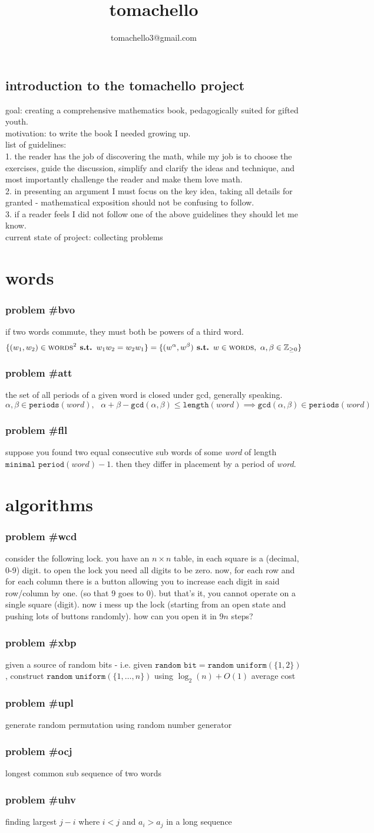 \documentclass{article}
\title{tomachello}
\author{tomachello3@gmail.com}
\date{}
\newcommand{\st}{\textbf{ s.t. }}
\newcommand{\SP}{\text{ }}
\newcommand{\problem}[1]{\subsubsection*{\textbf{problem \##1}}}
\newcommand{\chapter}[1]{\section*{#1}}
\newcommand{\Zpf}{\mathbb{Z}_{\ge0}}
\newcommand{\CST}[1]{\textsc{#1}}
\newcommand{\FNC}[1]{\texttt{#1}}
\newcommand{\VAR}[1]{\textit{#1}}
\begin{document}
\maketitle

\subsection*{introduction to the tomachello project}
goal: creating a comprehensive mathematics book, pedagogically suited for gifted youth.\\
motivation: to write the book I needed growing up.\\
list of guidelines:\\
1. the reader has the job of discovering the math, while my job is to choose the exercises, guide the discussion, simplify and clarify the ideas and technique, and most importantly challenge the reader and make them love math.\\
2. in presenting an argument I must focus on the key idea, taking all details for granted - mathematical exposition should not be confusing to follow.\\
3. if a reader feels I did not follow one of the above guidelines they should let me know.\\
current state of project: collecting problems

\chapter{words}
\problem{bvo} if two words commute, they must both be powers of a third word. 
$$\{(w_1,w_2)\in \CST{words}^2 \st w_1w_2=w_2w_1\}=\{(w^\alpha,w^\beta)\st w\in\CST{words},\SP\alpha,\beta\in\Zpf\}$$
\problem{att} the set of all periods of a given word is closed under gcd, generally speaking.
$$\alpha,\beta\in \FNC{periods}(\VAR{word}), \SP\alpha+\beta-\FNC{gcd}(\alpha,\beta)\le \FNC{length}(\VAR{word})\implies \FNC{gcd}(\alpha,\beta)\in\FNC{periods}(\VAR{word})$$
\problem{fll} suppose you found two equal consecutive sub words of some \VAR{word} of length $\FNC{minimal period}(\VAR{word})-1$. then they differ in placement by a period of \VAR{word}.
\chapter{algorithms}
\problem{wcd} consider the following lock. you have an $n\times n$ table, in each square is a 
(decimal, 0-9) digit. to open the lock you need all digits to be zero. now, for each row and for each column there is a button allowing you to increase each digit in said row/column by one. (so that 9 goes to 0). but that's it, you cannot operate on a single square (digit). now i mess up the lock (starting from an open state and pushing lots of buttons randomly). how can you open it in $9n$ steps?
\problem{xbp} given a source of random bits - i.e. given $\FNC{random bit}=\FNC{random uniform}(\{1,2\})$, construct $\FNC{random uniform}(\{1,\dots,n\})$ using $\log_2(n)+O(1)$ average cost
\problem{upl} generate random permutation using random number generator
\problem{ocj} longest common sub sequence of two words
\problem{uhv} finding largest $j-i$ where $i<j$ and $a_i>a_j$ in a long sequence
\end{document}
